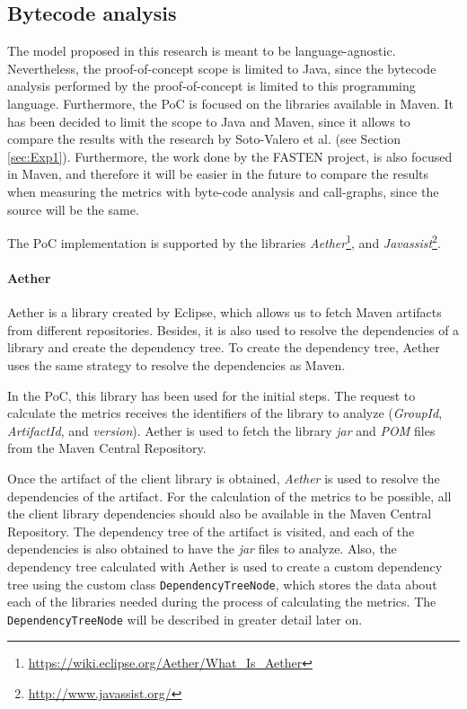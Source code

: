 \subsection{Bytecode analysis}
The model proposed in this research is meant to be language-agnostic. Nevertheless, the proof-of-concept scope is limited to Java, since the bytecode analysis performed by the proof-of-concept is limited to this programming language. Furthermore, the PoC is focused on the libraries available in Maven. It has been decided to limit the scope to Java and Maven, since it allows to compare the results with the research by Soto-Valero et al. \cite{soto2020comprehensive} (see Section \ref{sec:Exp1}). Furthermore, the work done by the FASTEN project, is also focused in Maven, and therefore it will be easier in the future to compare the results when measuring the metrics with byte-code analysis and call-graphs, since the source will be the same.

The PoC implementation is supported by the libraries  \textit{Aether}\footnote{\url{https://wiki.eclipse.org/Aether/What_Is_Aether}}, and \textit{Javassist}\footnote{\url{http://www.javassist.org/}}.

\paragraph{Aether}
Aether is a library created by Eclipse, which allows us to fetch Maven artifacts from different repositories. Besides, it is also used to resolve the dependencies of a library and create the dependency tree. To create the dependency tree, Aether uses the same strategy to resolve the dependencies as Maven.

In the PoC, this library has been used for the initial steps. The request to calculate the metrics receives the identifiers of the library to analyze (\textit{GroupId}, \textit{ArtifactId}, and \textit{version}). Aether is used to fetch the library \textit{jar} and \textit{POM} files from the Maven Central Repository.

Once the artifact of the client library is obtained, \textit{Aether} is used to resolve the dependencies of the artifact. For the calculation of the metrics to be possible, all the client library dependencies should also be available in the Maven Central Repository. The dependency tree of the artifact is visited, and each of the dependencies is also obtained to have the \textit{jar} files to analyze. Also, the dependency tree calculated with Aether is used to create a custom dependency tree using the custom class \texttt{DependencyTreeNode}, which stores the data about each of the libraries needed during the process of calculating the metrics. The \texttt{DependencyTreeNode} will be described in greater detail later on.

